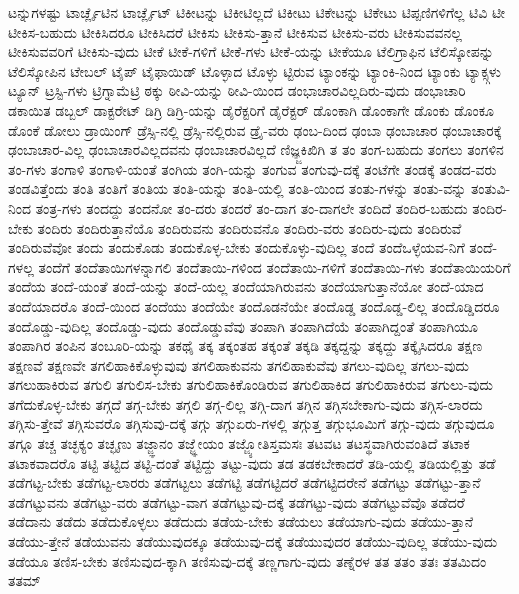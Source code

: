 {ಟನ್ನುಗಳಷ್ಟು
ಟಾರ್ಚ್ಲೈಟಿನ
ಟಾರ್ಚ್ಲೈಟ್
ಟಿಕೀಟನ್ನು
ಟಿಕೀಟಿಲ್ಲದೆ
ಟಿಕೀಟು
ಟಿಕೇಟನ್ನು
ಟಿಕೇಟು
ಟಿಪ್ಪಣಿಗಳಿಗೆಲ್ಲ
ಟಿವಿ
ಟೀ
ಟೀಕಿಸ-ಬಹುದು
ಟೀಕಿಸಿದರೂ
ಟೀಕಿಸಿದರೆ
ಟೀಕಿಸು
ಟೀಕಿಸು-ತ್ತಾನೆ
ಟೀಕಿಸುವ
ಟೀಕಿಸು-ವರು
ಟೀಕಿಸುವವನಲ್ಲ
ಟೀಕಿಸುವವರಿಗೆ
ಟೀಕಿಸು-ವುದು
ಟೀಕೆ
ಟೀಕೆ-ಗಳಿಗೆ
ಟೀಕೆ-ಗಳು
ಟೀಕೆ-ಯನ್ನು
ಟೀಕೆಯೂ
ಟೆಲಿಗ್ರಾಫಿನ
ಟೆಲಿಸ್ಕೋಪನ್ನು
ಟೆಲಿಸ್ಕೋಪಿನ
ಟೇಬಲ್
ಟೈಪ್
ಟೈಫಾಯಿಡ್
ಟೊಳ್ಳಾದ
ಟೊಳ್ಳು
ಟ್ಟಿರುವ
ಟ್ಯಾಂಕನ್ನು
ಟ್ಯಾಂಕಿ-ನಿಂದ
ಟ್ಯಾಂಕು
ಟ್ಯಾಕ್ಸ್ಗಳು
ಟ್ಯೂನ್
ಟ್ರಸ್ಟಿ-ಗಳು
ಟ್ರಿಗ್ನಾಮೆಟ್ರಿ
ಠಕ್ಕು
ಠೀವಿ-ಯನ್ನು
ಠೀವಿ-ಯಿಂದ
ಡಂಭಾಚಾರವಿಲ್ಲದಿರು-ವುದು
ಡಂಭಾಚಾರಿ
ಡಕಾಯಿತ
ಡಬ್ಬಲ್
ಡಾಕ್ಟರೇಟ್
ಡಿಗ್ರಿ
ಡಿಗ್ರಿ-ಯನ್ನು
ಡೈರೆಕ್ಟರಿಗೆ
ಡೈರೆಕ್ಟರ್
ಡೊಂಕಾಗಿ
ಡೊಂಕಾಗೇ
ಡೊಂಕು
ಡೊಂಕೂ
ಡೊಂಕೆ
ಡೋಲು
ಡ್ರಾಯಿಂಗ್
ಡ್ರೆಸ್ಸಿ-ನಲ್ಲಿ
ಡ್ರೆಸ್ಸಿ-ನಲ್ಲಿರುವ
ಡ್ರೈ-ವರು
ಢಂಬ-ದಿಂದ
ಢಂಬಾ
ಢಂಬಾಚಾರ
ಢಂಬಾಚಾರಕ್ಕೆ
ಢಂಬಾಚಾರ-ವಿಲ್ಲ
ಢಂಬಾಚಾರವಿಲ್ಲದವನು
ಢಂಬಾಚಾರವಿಲ್ಲದೆ
ಣಿಜ್ಞ್ಜಕಿಖಿಗಿ
ತ
ತಂ
ತಂಗ-ಬಹುದು
ತಂಗಲು
ತಂಗಳಿನ
ತಂ-ಗಳು
ತಂಗಾಳಿ
ತಂಗಾಳಿ-ಯಂತೆ
ತಂಗಿಯ
ತಂಗಿ-ಯನ್ನು
ತಂಗುವ
ತಂಗುವು-ದಕ್ಕೆ
ತಂಟೆಗೇ
ತಂಡಕ್ಕೆ
ತಂಡದ-ವರು
ತಂಡವಿತ್ತೆಂದು
ತಂತಿ
ತಂತಿಗೆ
ತಂತಿಯ
ತಂತಿ-ಯನ್ನು
ತಂತಿ-ಯಲ್ಲಿ
ತಂತಿ-ಯಿಂದ
ತಂತು-ಗಳನ್ನು
ತಂತು-ವನ್ನು
ತಂತುವಿ-ನಿಂದ
ತಂತ್ರ-ಗಳು
ತಂದದ್ದು
ತಂದನೋ
ತಂ-ದರು
ತಂದರೆ
ತಂ-ದಾಗ
ತಂ-ದಾಗಲೇ
ತಂದಿದೆ
ತಂದಿರ-ಬಹುದು
ತಂದಿರ-ಬೇಕು
ತಂದಿರು
ತಂದಿರುತ್ತಾನೆಯೊ
ತಂದಿರುವನು
ತಂದಿರುವನೊ
ತಂದಿರು-ವರು
ತಂದಿರು-ವುದು
ತಂದಿರುವೆ
ತಂದಿರುವೆವೋ
ತಂದು
ತಂದುಕೊಡು
ತಂದುಕೊಳ್ಳ-ಬೇಕು
ತಂದುಕೊಳ್ಳು-ವುದಿಲ್ಲ
ತಂದೆ
ತಂದೆಒಳ್ಳೆಯವ-ನಿಗೆ
ತಂದೆ-ಗಳಲ್ಲ
ತಂದೆಗೆ
ತಂದೆತಾಯಿಗಳನ್ನಾಗಲಿ
ತಂದೆತಾಯಿ-ಗಳಿಂದ
ತಂದೆತಾಯಿ-ಗಳಿಗೆ
ತಂದೆತಾಯಿ-ಗಳು
ತಂದೆತಾಯಿಯರಿಗೆ
ತಂದೆಯ
ತಂದೆ-ಯಂತೆ
ತಂದೆ-ಯನ್ನು
ತಂದೆ-ಯಲ್ಲ
ತಂದೆಯಾಗಿರುವನು
ತಂದೆಯಾಗುತ್ತಾನೆಯೋ
ತಂದೆ-ಯಾದ
ತಂದೆಯಾದರೊ
ತಂದೆ-ಯಿಂದ
ತಂದೆಯು
ತಂದೆಯೇ
ತಂದೊಡನೆಯೇ
ತಂದೊಡ್ಡ
ತಂದೊಡ್ಡ-ಲಿಲ್ಲ
ತಂದೊಡ್ಡಿದರೂ
ತಂದೊಡ್ಡು-ವುದಿಲ್ಲ
ತಂದೊಡ್ಡು-ವುದು
ತಂದೊಡ್ಡುವೆವು
ತಂಪಾಗಿ
ತಂಪಾಗಿದೆಯೆ
ತಂಪಾಗಿದ್ದಂತೆ
ತಂಪಾಗಿಯೂ
ತಂಪಾಗಿರ
ತಂಪಿನ
ತಂಬೂರಿ-ಯನ್ನು
ತಕಥೈ
ತಕ್ಕ
ತಕ್ಕಂತಹ
ತಕ್ಕಂತೆ
ತಕ್ಕಡಿ
ತಕ್ಕದ್ದನ್ನು
ತಕ್ಕದ್ದು
ತಕ್ಕೈಸಿದರೂ
ತಕ್ಷಣ
ತಕ್ಷಣವೆ
ತಕ್ಷಣವೇ
ತಗಲಿಹಾಕಿಕೊಳ್ಳುವುವು
ತಗಲಿಹಾಕುವನು
ತಗಲಿಹಾಕುವೆವು
ತಗಲು-ವುದಿಲ್ಲ
ತಗಲು-ವುದು
ತಗಲುಹಾಕಿರುವ
ತಗುಲಿ
ತಗುಲಿಸ-ಬೇಕು
ತಗುಲಿಹಾಕಿಕೊಂಡಿರುವ
ತಗುಲಿಹಾಕಿದ
ತಗುಲಿಹಾಕಿರುವ
ತಗುಲು-ವುದು
ತಗೆದುಕೊಳ್ಳ-ಬೇಕು
ತಗ್ಗದೆ
ತಗ್ಗ-ಬೇಕು
ತಗ್ಗಲಿ
ತಗ್ಗ-ಲಿಲ್ಲ
ತಗ್ಗಿ-ದಾಗ
ತಗ್ಗಿನ
ತಗ್ಗಿಸಬೇಕಾಗು-ವುದು
ತಗ್ಗಿಸ-ಲಾರದು
ತಗ್ಗಿಸು-ತ್ತೇವೆ
ತಗ್ಗಿಸುವರೊ
ತಗ್ಗಿಸುವು-ದಕ್ಕೆ
ತಗ್ಗು
ತಗ್ಗುಏರು-ಗಳಲ್ಲಿ
ತಗ್ಗುತ್ತ
ತಗ್ಗುಭೂಮಿಗೆ
ತಗ್ಗು-ವುದು
ತಗ್ಗುವುದೂ
ತಗ್ಗೂ
ತಚ್ಚ
ತಚ್ಛಕ್ಯಂ
ತಚ್ಛೃಣು
ತಜ್ಜ್ಞಾನಂ
ತಜ್ಜ್ಞೇಯಂ
ತಜ್ಜ್ಯೋತಿಸ್ತಮಸಃ
ತಟವಟ
ತಟಸ್ಥವಾಗಿರುವಂತಿದೆ
ತಟಾಕ
ತಟಾಕವಾದರೊ
ತಟ್ಟಿ
ತಟ್ಟಿದ
ತಟ್ಟಿ-ದಂತೆ
ತಟ್ಟಿದ್ದು
ತಟ್ಟು-ವುದು
ತಡ
ತಡಕಬೇಕಾದರೆ
ತಡಿ-ಯಲ್ಲಿ
ತಡಿಯಲ್ಲಿತ್ತು
ತಡೆ
ತಡೆಗಟ್ಟ-ಬೇಕು
ತಡೆಗಟ್ಟ-ಲಾರರು
ತಡೆಗಟ್ಟಲು
ತಡೆಗಟ್ಟಿ
ತಡೆಗಟ್ಟಿದರೆ
ತಡೆಗಟ್ಟಿದರೇನೆ
ತಡೆಗಟ್ಟು
ತಡೆಗಟ್ಟು-ತ್ತಾನೆ
ತಡೆಗಟ್ಟುವನು
ತಡೆಗಟ್ಟು-ವರು
ತಡೆಗಟ್ಟು-ವಾಗ
ತಡೆಗಟ್ಟುವು-ದಕ್ಕೆ
ತಡೆಗಟ್ಟು-ವುದು
ತಡೆಗಟ್ಟುವೆವೊ
ತಡೆದರೆ
ತಡೆದಾನು
ತಡೆದು
ತಡೆದುಕೊಳ್ಳಲು
ತಡೆದುದು
ತಡೆಯ-ಬೇಕು
ತಡೆಯಲು
ತಡೆಯಾಗು-ವುದು
ತಡೆಯು-ತ್ತಾನೆ
ತಡೆಯು-ತ್ತೇನೆ
ತಡೆಯುವನು
ತಡೆಯುವುದಕ್ಕೂ
ತಡೆಯುವು-ದಕ್ಕೆ
ತಡೆಯುವುದರ
ತಡೆಯು-ವುದಿಲ್ಲ
ತಡೆಯು-ವುದು
ತಡೆಯೂ
ತಣಿಸ-ಬೇಕು
ತಣಿಸುವುದ-ಕ್ಕಾಗಿ
ತಣಿಸುವು-ದಕ್ಕೆ
ತಣ್ಣಗಾಗು-ವುದು
ತಣ್ನೆರಳ
ತತ
ತತಂ
ತತಃ
ತತಮಿದಂ
ತತಮ್
}
